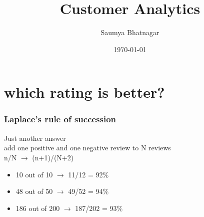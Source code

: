 \documentclass{beamer}
\title[DBMS]{Customer Analytics} %
\author{Saumya Bhatnagar} %
\date{\today} %
\begin{document}
\begin{frame}
\titlepage %
\end{frame}






\section{which rating is better?}

\begin{frame}\frametitle{Laplace's rule of succession}
	Just another answer\\
	add one positive and one negative review to N reviews\\ 
	n/N $\rightarrow$ (n+1)/(N+2)\\
	\begin{itemize}
		\item 10 out of 10 $\rightarrow$ 11/12 = 92\%
		\item 48 out of 50 $\rightarrow$ 49/52 = 94\%
		\item 186 out of 200 $\rightarrow$ 187/202 = 93\%
	\end{itemize}
\end{frame}
\end{document}
